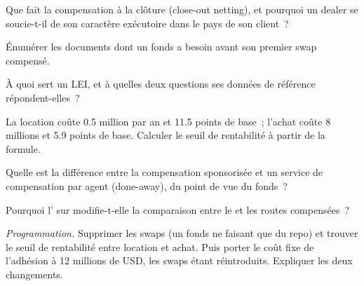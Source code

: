 \begin{exercise}[$\star$]\label{exo:m2:getting-access-rates-credit:1}
Que fait la compensation à la clôture (close-out netting), et pourquoi un dealer se soucie-t-il
de son caractère exécutoire dans le pays de son client~?
\end{exercise}

\begin{exercise}[$\star$]\label{exo:m2:getting-access-rates-credit:2}
Énumérer les documents dont un fonds a besoin avant son premier swap compensé.
\end{exercise}

\begin{exercise}[$\star$]\label{exo:m2:getting-access-rates-credit:3}
À quoi sert un LEI, et à quelles deux questions ses données de référence répondent-elles~?
\end{exercise}

\begin{exercise}[$\star\star$]\label{exo:m2:getting-access-rates-credit:4}
La location coûte 0.5 million par an et 11.5 points de base~; l'achat coûte 8 millions
et 5.9 points de base. Calculer le seuil de rentabilité à partir de la formule.
\end{exercise}

\begin{exercise}[$\star\star$]\label{exo:m2:getting-access-rates-credit:5}
Quelle est la différence entre la compensation sponsorisée et un service de compensation
par agent (done-away), du point de vue du fonds~?
\end{exercise}

\begin{exercise}[$\star\star$]\label{exo:m2:getting-access-rates-credit:6}
Pourquoi l' sur  modifie-t-elle la comparaison
entre le  et les routes compensées~?
\end{exercise}

\begin{exercise}[$\star\star\star$]\label{exo:m2:getting-access-rates-credit:7}
\emph{Programmation.} Supprimer les swaps (un fonds ne faisant que du repo) et trouver le
seuil de rentabilité entre location et achat. Puis porter le coût fixe de l'adhésion à 12 millions de USD, les swaps
étant réintroduits. Expliquer les deux changements.
\end{exercise}

